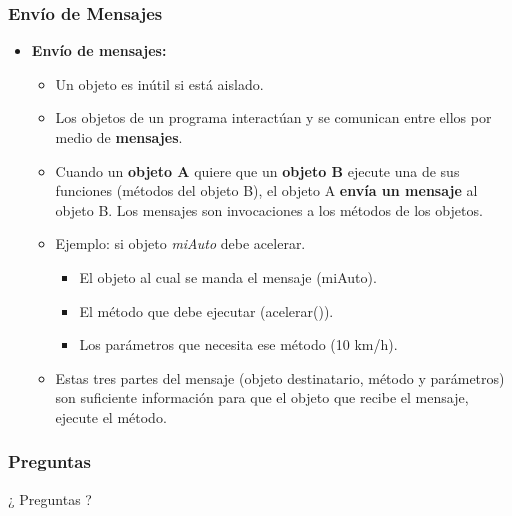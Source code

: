 \documentclass{beamer}
\begin{document}
  \begin{frame}
    \frametitle{Envío de Mensajes}

    \begin{itemize}
    \item \textbf{Envío de mensajes:}
      \begin{itemize}
      \item Un objeto es inútil si está aislado.
      \item Los objetos de un programa interactúan y se comunican entre ellos por medio de \textbf{mensajes}.
      \item Cuando un \textbf{objeto A} quiere que un \textbf{objeto B} ejecute una de sus funciones (métodos del objeto B), el objeto A \textbf{envía un mensaje} al objeto B. Los mensajes son invocaciones a los métodos de los objetos. 
      \item Ejemplo: si objeto \emph{miAuto} debe acelerar.
        \begin{itemize}
        \item[] El objeto al cual se manda el mensaje (miAuto).
        \item[] El método que debe ejecutar (acelerar()).
        \item[] Los parámetros que necesita ese método (10 km/h).
        \end{itemize}
      \item Estas tres partes del mensaje (objeto destinatario, método y parámetros) son suficiente información para que el objeto que recibe el mensaje, ejecute el método.
      \end{itemize}
    \end{itemize}
  \end{frame}      

  \begin{frame}
    \frametitle{Preguntas}

    \hspace{4cm}\huge{¿ Preguntas ?}
    
  \end{frame}
\end{document}
